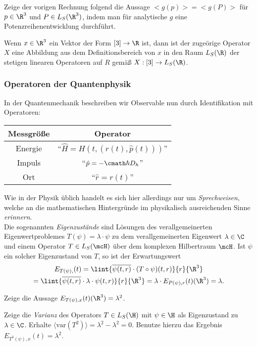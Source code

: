 \documentclass{subfiles}
\begin{document}
            \begin{Aufgabe}
                \nr{} Zeige der vorigen Rechnung folgend die Aussage $<g(p)> = <g(P)>$ für $p\in\R^3$ und $P\in L_S(\R^3)$, indem man für analytische $g$ eine Potenzreihenentwicklung durchführt. 
            \end{Aufgabe}

        Wenn $x\in\R^3$ ein Vektor der Form $[3]\to\R$ ist, dann ist der zugeörige Operator $X$ eine Abbildung aus dem Definitionsbereich von $x$ in den Raum $L_S(\R)$ der stetigen linearen Operatoren auf $R$ gemäß $X:[3]\to L_S(\R)$. 

        \subsubsection*{Operatoren der Quantenphysik}
            In der Quantenmechanik beschreiben wir Observable nun durch Identifikation mit Operatoren:
            \begin{table}[H]
                \centering
                \begin{tabular}{c|c}
                    Messgröße & Operator \\
                    \hline
                    Energie & \enquote{$\hat H = H(t,(r(t),\hat p(t)))$} \\
                    Impuls & \enquote{$\hat p = -\cmath\hbar D_h$} \\
                    Ort & \enquote{$\hat r = r(t)$}
                \end{tabular}
            \end{table}
            Wie in der Physik üblich handelt es sich hier allerdings nur um \emph{Sprechweisen}, welche an die mathematischen Hintergründe im physikalisch ausreichenden Sinne \emph{erinnern}. \\

            Die sogenannten \emph{Eigenzustände} sind Lösungen des verallgemeinerten Eigenwertproblemes $T(\psi) = \lambda\cdot\psi$ zu dem verallgemeinerten Eigenwert $\lambda\in\C$ und einem Operator $T\in L_S(\mcH)$ über dem komplexen Hilbertraum $\mcH$. Ist $\psi$ ein solcher Eigenzustand von $T$, so ist der Erwartungswert 
            \begin{multline*}
                E_{T(\psi),}(t) = \lint{\overline{\psi(t,r)}\cdot (T\circ\psi)(t,r)}{r}{\R^3} \\
                = \lint{\overline{\psi(t,r)}\cdot \lambda\cdot\psi(t,r)}{r}{\R^3} = \lambda\cdot E_{P(\psi),r}(t)(\R^3) = \lambda.
            \end{multline*}
            
            \begin{Aufgabe}
                \nr{} Zeige die Aussage $E_{T(\psi),x}(t)(\R^3) = \lambda^2$. 

                \nr{} Zeige die \emph{Varianz} des Operators $T\in L_S(\H)$ mit $\psi\in\H$ als Eigenzustand zu $\lambda\in\C$. Erhalte $\langle\text{var}(T^2)\rangle = \lambda^2-\lambda^2 = 0$. Benutze hierzu das Ergebnis $E_{T^2(\psi),x}(t) = \lambda^2$. 
            \end{Aufgabe}
\end{document}
